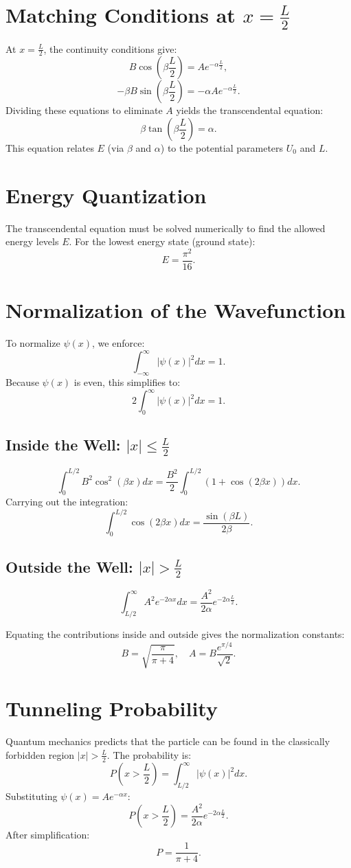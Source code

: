 \documentclass[a4paper,12pt]{article}
\begin{document}
\begin{multicols}{2}
\section{Matching Conditions at \( x = \frac{L}{2} \)}
At \( x = \frac{L}{2} \), the continuity conditions give:
\[
B\cos\left(\beta \frac{L}{2}\right) = A e^{-\alpha \frac{L}{2}},
\]
\[
-\beta B\sin\left(\beta \frac{L}{2}\right) = -\alpha A e^{-\alpha \frac{L}{2}}.
\]
Dividing these equations to eliminate \( A \) yields the transcendental equation:
\[
\beta \tan\left(\beta \frac{L}{2}\right) = \alpha.
\]
This equation relates \( E \) (via \( \beta \) and \( \alpha \)) to the potential parameters \( U_0 \) and \( L \).

\section{Energy Quantization}
The transcendental equation must be solved numerically to find the allowed energy levels \( E \). For the lowest energy state (ground state):
\[
E = \frac{\pi^2}{16}.
\]

\section{Normalization of the Wavefunction}
To normalize \( \psi(x) \), we enforce:
\[
\int_{-\infty}^\infty |\psi(x)|^2 dx = 1.
\]
Because \( \psi(x) \) is even, this simplifies to:
\[
2\int_0^\infty |\psi(x)|^2 dx = 1.
\]

\subsection{Inside the Well: \( |x| \leq \frac{L}{2} \)}
\[
\int_0^{L/2} B^2\cos^2(\beta x) dx = \frac{B^2}{2}\int_0^{L/2} (1 + \cos(2\beta x)) dx.
\]
Carrying out the integration:
\[
\int_0^{L/2} \cos(2\beta x) dx = \frac{\sin(\beta L)}{2\beta}.
\]

\subsection{Outside the Well: \( |x| > \frac{L}{2} \)}
\[
\int_{L/2}^\infty A^2 e^{-2\alpha x} dx = \frac{A^2}{2\alpha} e^{-2\alpha \frac{L}{2}}.
\]

Equating the contributions inside and outside gives the normalization constants:
\[
B = \sqrt{\frac{\pi}{\pi + 4}}, \quad A = B \frac{e^{\pi/4}}{\sqrt{2}}.
\]

\section{Tunneling Probability}
Quantum mechanics predicts that the particle can be found in the classically forbidden region \( |x| > \frac{L}{2} \). The probability is:
\[
P(x > \frac{L}{2}) = \int_{L/2}^\infty |\psi(x)|^2 dx.
\]
Substituting \( \psi(x) = A e^{-\alpha x} \):
\[
P(x > \frac{L}{2}) = \frac{A^2}{2\alpha} e^{-2\alpha \frac{L}{2}}.
\]
After simplification:
\[
P = \frac{1}{\pi + 4}.
\]


\end{multicols}
\end{document}
